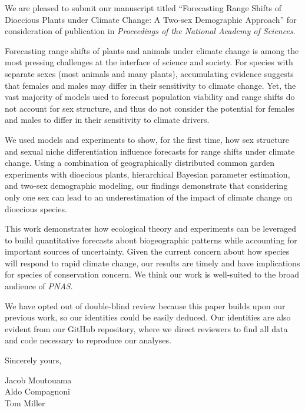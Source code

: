 \documentclass{article}
\begin{document}
We are pleased to submit our manuscript titled “Forecasting Range Shifts of Dioecious Plants under Climate Change: A Two-sex Demographic Approach” for consideration of publication in  \textit{
Proceedings of the National Academy of Sciences}.

Forecasting range shifts of plants and animals under climate change is among the most pressing challenges at the interface of science and society. 
For species with separate sexes (most animals and many plants), accumulating evidence suggests that females and males may differ in their sensitivity to climate change. 
Yet, the vast majority of models used to forecast population viability and range shifts do not account for sex structure, and thus do not consider the potential for females and males to differ in their sensitivity to climate drivers.

We used models and experiments to show, for the first time, how sex structure and sexual niche differentiation influence forecasts for range shifts under climate change. 
Using a combination of geographically distributed common garden experiments with dioecious plants, hierarchical Bayesian parameter estimation, and two-sex demographic modeling, our findings demonstrate that considering only one sex can lead to an underestimation of the impact of climate change on dioecious species.

This work demonstrates how ecological theory and experiments can be leveraged to build quantitative forecasts about biogeographic patterns while accounting for important sources of uncertainty. 
Given the current concern about how species will respond to rapid climate change, our results are timely and have implications for species of conservation concern.
We think our work is well-suited to the broad audience of \textit{PNAS}.

We have opted out of double-blind review because this paper builds upon our previous work, so our identities could be easily deduced. Our identities are also evident from our GitHub repository, where we direct reviewers to find all data and code necessary to reproduce our analyses.

\bigskip %

Sincerely yours,

\vspace{20pt} %


Jacob Moutouama \\
Aldo Compagnoni \\
Tom Miller
\end{document}
